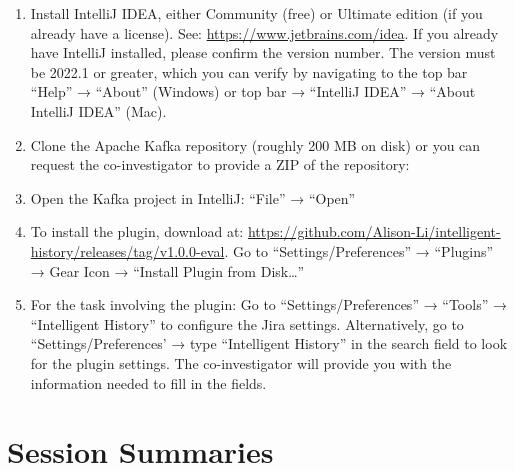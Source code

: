 \begin{enumerate}
    \item Install IntelliJ IDEA, either Community (free) or Ultimate edition (if you already have a license). See: \url{https://www.jetbrains.com/idea}. If you already have IntelliJ installed, please confirm the version number. The version must be 2022.1 or greater, which you can verify by navigating to the top bar  ``Help'' → ``About'' (Windows) or top bar → ``IntelliJ IDEA'' → ``About IntelliJ IDEA'' (Mac).
    \item Clone the Apache Kafka repository (roughly 200 MB on disk) or you can request the co-investigator to provide a ZIP of the repository: 
    
    \begin{center}
    \end{center}

    \item Open the Kafka project in IntelliJ: ``File'' → ``Open''
    \item To install the plugin, download  at: \url{https://github.com/Alison-Li/intelligent-history/releases/tag/v1.0.0-eval}. Go to “Settings/Preferences” → ``Plugins'' → Gear Icon → ``Install Plugin from Disk\dots''
    \item For the task involving the plugin: Go to ``Settings/Preferences'' → ``Tools'' → ``Intelligent History'' to configure the Jira settings. Alternatively, go to “Settings/Preferences’ → type ``Intelligent History'' in the search field to look for the plugin settings. The co-investigator will provide you with the information needed to fill in the fields.
\end{enumerate}


\pagebreak

\section{Session Summaries}
\label{sec:Summaries}

